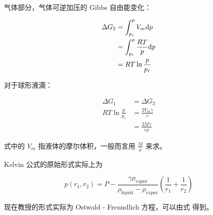 气体部分，气体可逆加压的 Gibbs 自由能变化：

\begin{align}
    \Delta G_2 & = \int_{p_r}^p V_m \mathrm{d} p          \\
               & = \int_{p_r}^p \frac{RT}{p} \mathrm{d} p \\
               & = RT \ln \frac{p}{p_r}
\end{align}

对于球形液滴：

\begin{align}
    \Delta G_1           & = \Delta G_2              \\
    RT \ln \frac{p}{p_r} & = \frac{2V_m \gamma}{r}   \\
                         & = \frac{2M\gamma}{r \rho}
\end{align}

式中的 $V_m$ 指液体的摩尔体积，一般而言用 $\frac{M}{\rho}$ 来求。

Kelvin 公式的原始形式实际上为

\begin{equation}
    \label{eq:kelvin}
    p(r_1, r_2) = P - \frac{\gamma \rho_{\mathrm{vapor}}}
    {\rho_{\mathrm{liquid}} - \rho_{\mathrm{vapor}}}
    \left(\frac{1}{r_1} + \frac{1}{r_2}\right)
\end{equation}

现在教授的形式实际为 Ostwald - Freundlich 方程，可以由式  得到。
